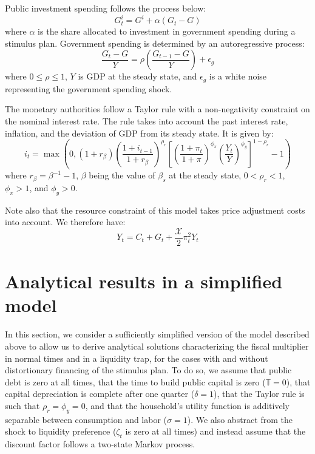 \documentclass[12pt,letterpaper]{article}
\newcommand{\T}{\mathbb{T}}
\newcommand{\XX}{\mathcal{X}}
\begin{document}
Public investment spending follows the process below:
\begin{equation}
G^i_t = G^i + \alpha(G_t - G) \tag{20}
\end{equation}
where $\alpha$ is the share allocated to investment in government spending during a stimulus plan. Government spending is determined by an autoregressive process:
\begin{equation}
\frac{G_t - G}{Y} = \rho\left(\frac{G_{t-1} - G}{Y}\right) + \epsilon_g \tag{21}
\end{equation}
where $0 \leq \rho \leq 1$, $Y$ is GDP at the steady state, and $\epsilon_g$ is a white noise representing the government spending shock.

The monetary authorities follow a Taylor rule with a non-negativity constraint on the nominal interest rate. The rule takes into account the past interest rate, inflation, and the deviation of GDP from its steady state. It is given by:
\begin{equation}
i_t = \max\left(0, (1+r_\beta)\left(\frac{1+i_{t-1}}{1+r_\beta}\right)^{\rho_r}\left[\left(\frac{1+\pi_t}{1+\pi}\right)^{\phi_\pi}\left(\frac{Y_t}{Y}\right)^{\phi_y}\right]^{1-\rho_r} - 1\right) \tag{22}
\end{equation}
where $r_\beta = \beta^{-1} - 1$, $\beta$ being the value of $\beta_s$ at the steady state, $0 < \rho_r < 1$, $\phi_\pi > 1$, and $\phi_y > 0$.

Note also that the resource constraint of this model takes price adjustment costs into account. We therefore have:
\begin{equation}
Y_t = C_t + G_t + \frac{\XX}{2}\pi_t^2 Y_t \tag{23}
\end{equation}

\section{Analytical results in a simplified model}

In this section, we consider a sufficiently simplified version of the model described above to allow us to derive analytical solutions characterizing the fiscal multiplier in normal times and in a liquidity trap, for the cases with and without distortionary financing of the stimulus plan. To do so, we assume that public debt is zero at all times, that the time to build public capital is zero ($\T = 0$), that capital depreciation is complete after one quarter ($\delta = 1$), that the Taylor rule is such that $\rho_r = \phi_y = 0$, and that the household's utility function is additively separable between consumption and labor ($\sigma = 1$). We also abstract from the shock to liquidity preference ($\zeta_t$ is zero at all times) and instead assume that the discount factor follows a two-state Markov process.
\end{document}
